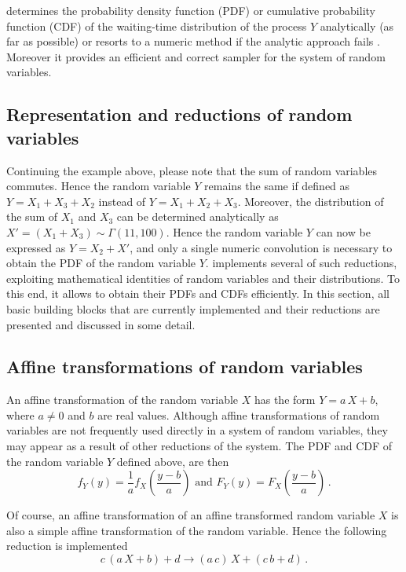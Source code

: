  determines the probability density function (PDF) or cumulative probability function
(CDF) of the waiting-time distribution of the process $Y$ analytically (as far as
possible) or resorts to a numeric method if the analytic approach fails 
\cite[see][for examples of numerical approximations outperforming the stochastic simulation approach]{Thomas2012, Thomas2013}.
Moreover it provides an efficient and correct sampler for the system of random variables.

\subsection{Representation and reductions of random variables}
Continuing the example above, please note that the sum of random variables commutes. Hence the
random variable $Y$ remains the same if defined as $Y = X_1 + X_3 + X_2$ instead of 
$Y = X_1 + X_2 + X_3$. Moreover, the 
distribution of the sum of $X_1$ and $X_3$ can be determined analytically as 
$X' = (X_1+X_3)\sim\Gamma(11,100)$. Hence the random variable $Y$ can now be expressed as 
$Y = X_2 + X'$, and only a single numeric convolution is necessary to obtain the PDF of the
random variable $Y$.  implements several of such reductions, exploiting mathematical
identities of random variables and their distributions. To this end, it allows to obtain their PDFs and 
CDFs efficiently. In this section, all basic building blocks that are currently implemented and their 
reductions are presented and discussed in some detail.

\subsection{Affine transformations of random variables}
An affine transformation of the random variable $X$ has the form $Y = a\,X+b$, where $a\neq 0$
and $b$ are real values. Although affine transformations of random variables are not frequently
used directly in a system of random variables, they may appear as a result of other reductions
of the system. The PDF and CDF of the random variable $Y$ defined above, are then 
\begin{equation}
 f_Y(y) = \frac{1}{a}f_X\left(\frac{y-b}{a}\right)\text{ and }
 F_Y(y) = F_X\left(\frac{y-b}{a}\right)\,. \nonumber
\end{equation}

Of course, an affine transformation of an affine transformed random variable $X$ is also a simple 
affine transformation of the random variable. Hence the following reduction is implemented
\begin{equation}
 c\,(a\,X+b)+d \longrightarrow (a\,c)\,X+(c\,b+d)\,.\nonumber
\end{equation}

